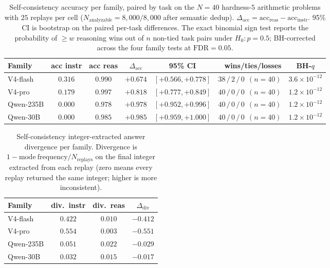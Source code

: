 \begin{table}[!htbp]
\centering\small
\caption{Self-consistency accuracy per family, paired by task on the
$N=40$ hardness-$5$ arithmetic problems with $25$ replays per cell
($N_{\mathrm{analyzable}}=8{,}000/8{,}000$ after semantic dedup).
$\Delta_{\mathrm{acc}}=\mathrm{acc}_{\mathrm{reas}} -
\mathrm{acc}_{\mathrm{instr}}$. 95\% CI is bootstrap on the paired
per-task differences. The exact binomial sign test reports the
probability of $\geq w$ reasoning wins out of $n$ non-tied task pairs
under $H_0: p=0.5$; BH-corrected across the four family tests at
$\mathrm{FDR}=0.05$.}
\label{tab:selfconsistency:acc}
\begin{tabular}{lccccrc}
\toprule
Family & acc instr & acc reas & $\Delta_\mathrm{acc}$ & 95\% CI & wins/ties/losses & BH-$q$ \\
\midrule
V4-flash      & $0.316$ & $0.990$ & $+0.674$ & $[+0.566,+0.778]$ & $38\,/\,2\,/\,0\ \ (n{=}40)$ & $3.6{\times}10^{-12}$ \\
V4-pro        & $0.179$ & $0.997$ & $+0.818$ & $[+0.777,+0.849]$ & $40\,/\,0\,/\,0\ \ (n{=}40)$ & $1.2{\times}10^{-12}$ \\
Qwen-235B     & $0.000$ & $0.978$ & $+0.978$ & $[+0.952,+0.996]$ & $40\,/\,0\,/\,0\ \ (n{=}40)$ & $1.2{\times}10^{-12}$ \\
Qwen-30B     & $0.000$ & $0.985$ & $+0.985$ & $[+0.959,+1.000]$ & $40\,/\,0\,/\,0\ \ (n{=}40)$ & $1.2{\times}10^{-12}$ \\
\bottomrule
\end{tabular}
\end{table}

\begin{table}[!htbp]
\centering\small
\caption{Self-consistency integer-extracted answer divergence per family.
Divergence is $1-\mathrm{mode\ frequency}/N_{\mathrm{replays}}$ on the
final integer extracted from each replay (zero means every replay
returned the same integer; higher is more inconsistent).}
\label{tab:selfconsistency:div}
\begin{tabular}{lccc}
\toprule
Family & div.\ instr & div.\ reas & $\Delta_\mathrm{div}$ \\
\midrule
V4-flash   & $0.422$ & $0.010$ & $-0.412$ \\
V4-pro     & $0.554$ & $0.003$ & $-0.551$ \\
Qwen-235B  & $0.051$ & $0.022$ & $-0.029$ \\
Qwen-30B   & $0.032$ & $0.015$ & $-0.017$ \\
\bottomrule
\end{tabular}
\end{table}


